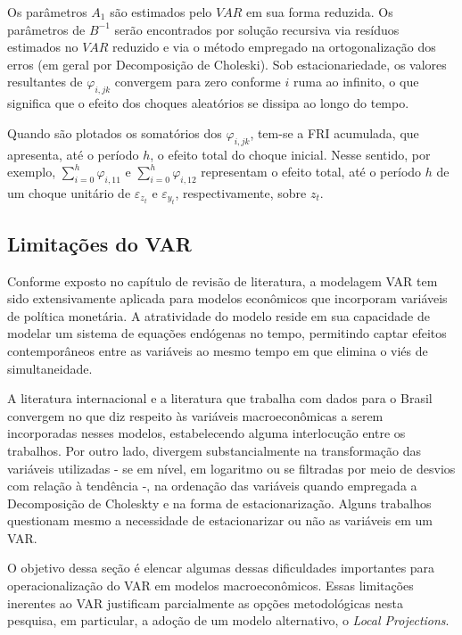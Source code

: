 Os parâmetros \(A_1\) são estimados pelo \(VAR\) em sua forma reduzida. Os parâmetros de \(B^{-1}\) serão encontrados por solução recursiva via resíduos estimados no \(VAR\) reduzido e via o método empregado na ortogonalização dos erros (em geral por Decomposição de Choleski). Sob estacionariedade, os valores resultantes de \(\varphi_{i,jk}\) convergem para zero conforme \(i\) ruma ao infinito, o que significa que o efeito dos choques aleatórios se dissipa ao longo do tempo. 

Quando são plotados os somatórios dos  \(\varphi_{i,jk}\), tem-se a FRI acumulada, que apresenta, até o período \(h\), o efeito total do choque inicial. Nesse sentido, por exemplo, \(\sum_{i=0}^{h}\varphi_{i,11}\) e \(\sum_{i=0}^{h}\varphi_{i,12}\) representam o efeito total, até o período \(h\) de um choque unitário de \(\varepsilon_{z_t}\) e \(\varepsilon_{y_t}\), respectivamente, sobre \(z_t\).




\subsection{Limitações do VAR}

Conforme exposto no capítulo de revisão de literatura, a modelagem VAR tem sido extensivamente aplicada para modelos econômicos que incorporam variáveis de política monetária. A atratividade do modelo reside em sua capacidade de modelar um sistema de equações endógenas no tempo, permitindo captar efeitos contemporâneos entre as variáveis ao mesmo tempo em que elimina o viés de simultaneidade. 

A literatura internacional e a literatura que trabalha com dados para o Brasil convergem no que diz respeito às variáveis macroeconômicas a serem incorporadas nesses modelos, estabelecendo alguma interlocução entre os trabalhos. Por outro lado, divergem substancialmente na transformação das variáveis utilizadas - se em nível, em logaritmo ou se filtradas por meio de desvios com relação à tendência -, na ordenação das variáveis quando empregada a Decomposição de Choleskty e na forma de estacionarização. Alguns trabalhos questionam mesmo a necessidade de estacionarizar ou não as variáveis em um VAR.

O objetivo dessa seção é elencar algumas dessas dificuldades importantes para operacionalização do VAR em modelos macroeconômicos. Essas limitações inerentes ao VAR justificam parcialmente as opções metodológicas nesta pesquisa, em particular, a adoção de um modelo alternativo, o \textit{Local Projections}.


